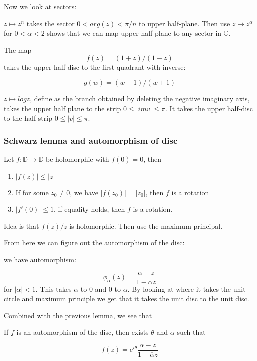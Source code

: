 \documentclass[main.tex]{subfiles}
\begin{document}
Now we look at sectors:

\begin{example}
$z \mapsto z^n$ takes the sector $0 < arg(z) < \pi/n$ to upper half-plane.
Then use $z \mapsto z^\alpha$ for $0 < \alpha < 2$ shows that we can map upper half-plane to any sector in $\mathbb{C}$.
\end{example}

\begin{example}
The map 
$$
f(z) = (1 + z)/(1 -z)
$$
takes the upper half disc to the first quadrant with inverse:

$$
g(w) = (w-1)/(w+1)
$$
\end{example}

\begin{example}
$z \mapsto log z$, define as the branch obtained by deleting the negative imaginary axis, takes the upper half plane to the strip $0 \leq |im v| \leq \pi$. It takes the upper half-disc to the half-strip $0 \leq |v| \leq \pi$.
\end{example}


\subsubsection{Schwarz lemma and automorphism of disc}

\begin{lemma}
Let $f: \mathbb{D} \rightarrow \mathbb{D}$ be holomorphic with $f(0) = 0$, then
\begin{enumerate}
    \item $|f(z)| \leq |z|$
    \item If for some $z_0 \neq 0$, we have $|f(z_0)| = |z_0|$, then $f$ is a rotation
    \item $|f'(0)| \leq 1$, if equality holds, then $f$ is a rotation.
\end{enumerate}
\end{lemma}

Idea is that $f(z)/z$ is holomorphic. Then use the maximum principal.

From here we can figure out the automorphism of the disc:

we have automorphism:

$$
\phi_\alpha(z) = \frac{\alpha - z}{1 - \overline{\alpha} z}
$$
for $|\alpha| < 1$. This takes $\alpha$ to $0$ and $0$ to $\alpha$. By looking at where it takes the unit circle and maximum principle we get that it takes the unit disc to the unit disc.

Combined with the previous lemma, we see that
\begin{theorem}
If $f$ is an automorphism of the disc, then exists $\theta$ and $\alpha$ such that 

$$
f(z) = e^{i\theta}\frac{\alpha - z}{1 - \overline{\alpha} z}
$$
\end{theorem}
\end{document}
